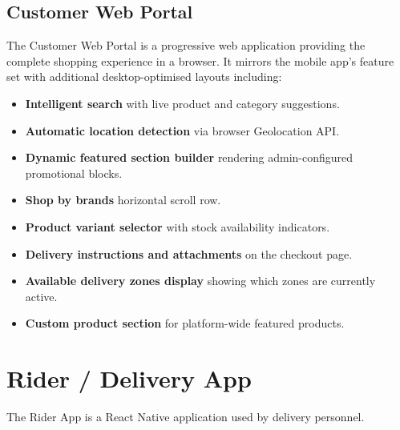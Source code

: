 \documentclass[12pt, a4paper, oneside]{report}
\begin{document}
\subsection{Customer Web Portal}

The Customer Web Portal is a progressive web application providing the
complete shopping experience in a browser. It mirrors the mobile app's feature
set with additional desktop-optimised layouts including:

\begin{itemize}
  \item \textbf{Intelligent search} with live product and category suggestions.
  \item \textbf{Automatic location detection} via browser Geolocation API.
  \item \textbf{Dynamic featured section builder} rendering admin-configured
        promotional blocks.
  \item \textbf{Shop by brands} horizontal scroll row.
  \item \textbf{Product variant selector} with stock availability indicators.
  \item \textbf{Delivery instructions and attachments} on the checkout page.
  \item \textbf{Available delivery zones display} showing which zones are
        currently active.
  \item \textbf{Custom product section} for platform-wide featured products.
\end{itemize}

\section{Rider / Delivery App}

The Rider App is a React Native application used by delivery personnel.
\end{document}
